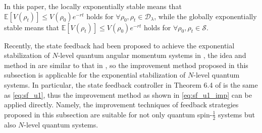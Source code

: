\documentclass[]{elsarticle}
\begin{document}
\begin{rmk}
	In this paper, the locally exponentially stable means that	$\mathbb{E}[V(\rho_t)]\leq V(\rho_0) e^{-r t}$	holds for $\forall \rho_{0}, \rho_{t}\in \mathcal{D}_\lambda$, while the globally exponentially stable means that $\mathbb{E}[V(\rho_t)]\leq V(\rho_0) e^{-r t}$ holds for $\forall \rho_0, \rho_{t} \in \mathcal{S}$.
\end{rmk}
\begin{rmk}
	Recently, the state feedback had been proposed to achieve the exponential stabilization of $N$-level quantum angular momentum systems in \cite{LAMJ2019}, the idea and method in \cite{LAMJ2019} are similar to that in \cite{LAMC2018}, so the improvement method proposed in this subsection is applicable for the exponential stabilization of $N$-level quantum systems. In particular, the state feedback controller in Theorem 6.4 of \cite{LAMJ2019} is the same as \eqref{eq:sf_u1}, thus the improvement method as shown in \eqref{eq:sf_u1_imp} can be applied directly. Namely, the improvement techniques of feedback strategies proposed in this subsection are suitable for not only quantum spin-$\frac{1}{2}$ systems but also $N$-level quantum systems.
\end{rmk}
\end{document}
